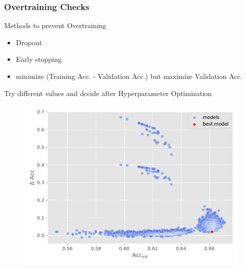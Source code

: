 \begin{frame}
    \frametitle{Overtraining Checks}
    
    \begin{alertblock}{Methods to prevent Overtraining}
        \begin{itemize}
            \item Dropout
            \item Early stopping
            \item minimize (Training Acc. - Validation Acc.) 
            \alert{but} maximize Validation Acc.
        \end{itemize}
    Try different values and decide after Hyperparameter Optimization
    \end{alertblock}
    \begin{figure}
        \includegraphics[scale=0.45]{../figures/HPO_scatter.pdf}
    \end{figure}
    
\end{frame}